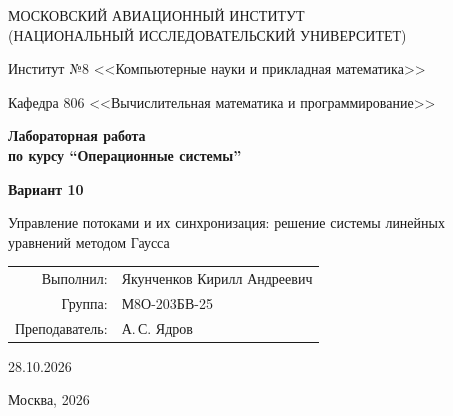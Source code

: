 \begin{titlepage}
\begin{center}
\large
МОСКОВСКИЙ АВИАЦИОННЫЙ ИНСТИТУТ\\ (НАЦИОНАЛЬНЫЙ ИССЛЕДОВАТЕЛЬСКИЙ УНИВЕРСИТЕТ)

\vspace{20pt}

Институт №8 <<Компьютерные науки и прикладная математика>>

Кафедра 806 <<Вычислительная математика и программирование>>
\end{center}

\vspace{60pt}

\begin{center}
\bfseries
\large
Лабораторная работа  \\по курсу \enquote{Операционные системы}

\vspace{54pt}

\textbf{\Large Вариант 10}

\vspace{12pt}

\normalfont
Управление потоками и их синхронизация: решение системы линейных уравнений
методом Гаусса
\end{center}

\vfill

\begin{flushright}
\large
\begin{tabular}{rl}
Выполнил: & Якунченков Кирилл Андреевич \\
Группа: & М8О-203БВ-25 \\
Преподаватель: & А.\,С. Ядров \\
\end{tabular}
\end{flushright}

\begin{center}28.10.2026\end{center}
\vspace{60pt}

\begin{center}
\large
Москва, 2026
\end{center}
\end{titlepage}

\pagebreak
